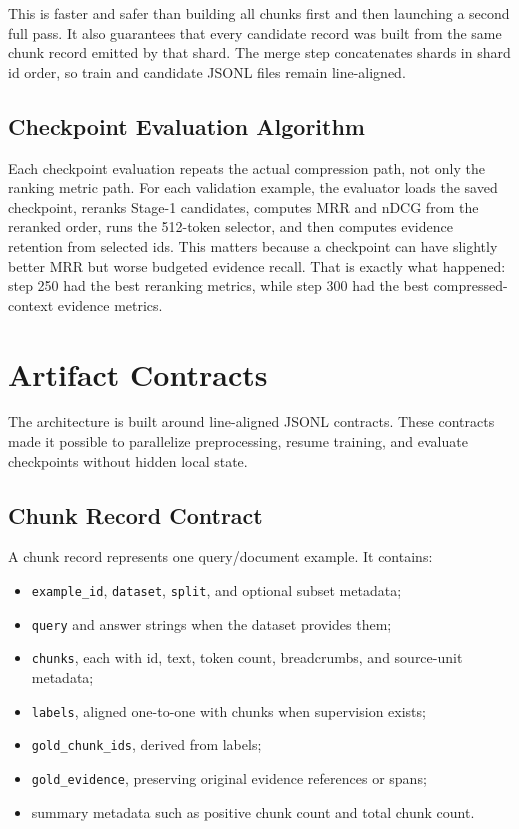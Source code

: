 \documentclass[10pt,twocolumn]{article}
\begin{document}
This is faster and safer than building all chunks first and then launching a second full pass. It also guarantees that every candidate record was built from the same chunk record emitted by that shard. The merge step concatenates shards in shard id order, so train and candidate JSONL files remain line-aligned.

\subsection{Checkpoint Evaluation Algorithm}
Each checkpoint evaluation repeats the actual compression path, not only the ranking metric path. For each validation example, the evaluator loads the saved checkpoint, reranks Stage-1 candidates, computes MRR and nDCG from the reranked order, runs the 512-token selector, and then computes evidence retention from selected ids. This matters because a checkpoint can have slightly better MRR but worse budgeted evidence recall. That is exactly what happened: step 250 had the best reranking metrics, while step 300 had the best compressed-context evidence metrics.

\section{Artifact Contracts}
The architecture is built around line-aligned JSONL contracts. These contracts made it possible to parallelize preprocessing, resume training, and evaluate checkpoints without hidden local state.

\subsection{Chunk Record Contract}
A chunk record represents one query/document example. It contains:
\begin{itemize}
\item \texttt{example\_id}, \texttt{dataset}, \texttt{split}, and optional subset metadata;
\item \texttt{query} and answer strings when the dataset provides them;
\item \texttt{chunks}, each with id, text, token count, breadcrumbs, and source-unit metadata;
\item \texttt{labels}, aligned one-to-one with chunks when supervision exists;
\item \texttt{gold\_chunk\_ids}, derived from labels;
\item \texttt{gold\_evidence}, preserving original evidence references or spans;
\item summary metadata such as positive chunk count and total chunk count.
\end{itemize}
\end{document}
